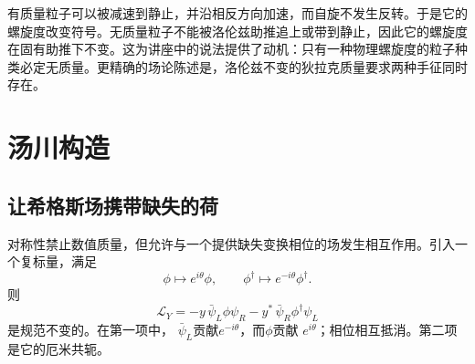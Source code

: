 有质量粒子可以被减速到静止，并沿相反方向加速，而自旋不发生反转。于是它的螺旋度改变符号。无质量粒子不能被洛伦兹助推追上或带到静止，因此它的螺旋度在固有助推下不变。这为讲座中的说法提供了动机：只有一种物理螺旋度的粒子种类必定无质量。更精确的场论陈述是，洛伦兹不变的狄拉克质量要求两种手征同时存在。

\begin{classroomqa}
\end{classroomqa}

\begin{classroomqa}
\end{classroomqa}

\begin{classroomqa}
\end{classroomqa}

\begin{classroomqa}
\end{classroomqa}

\section{汤川构造}

\subsection{让希格斯场携带缺失的荷}

对称性禁止数值质量，但允许与一个提供缺失变换相位的场发生相互作用。引入一个复标量，满足
\begin{equation}
  \phi\longmapsto e^{i\theta}\phi,
  \qquad
  \phi^\dagger\longmapsto e^{-i\theta}\phi^\dagger.
  \label{eq:l09-scalar-charge}
\end{equation}
则
\begin{equation}
  \mathcal L_Y
  =-y\,\bar\psi_L\phi\psi_R
   -y^*\,\bar\psi_R\phi^\dagger\psi_L
  \label{eq:l09-yukawa-lagrangian}
\end{equation}
是规范不变的。在第一项中，
\(\bar\psi_L\)贡献\(e^{-i\theta}\)，而\(\phi\)贡献
\(e^{i\theta}\)；相位相互抵消。第二项是它的厄米共轭。

